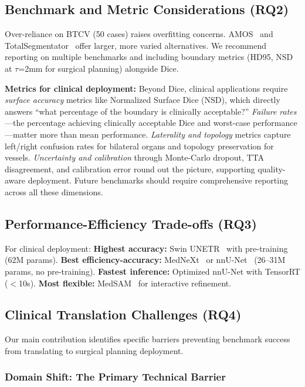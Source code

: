 \documentclass[conference]{IEEEtran}
\begin{document}
\subsection{Benchmark and Metric Considerations (RQ2)}

Over-reliance on BTCV (50 cases) raises overfitting concerns. AMOS~\cite{amos2022} and TotalSegmentator~\cite{wasserthal2023totalsegmentator} offer larger, more varied alternatives. We recommend reporting on multiple benchmarks and including boundary metrics (HD95, NSD at $\tau$=2mm for surgical planning) alongside Dice.

\textbf{Metrics for clinical deployment:} Beyond Dice, clinical applications require \emph{surface accuracy} metrics like Normalized Surface Dice (NSD), which directly answers ``what percentage of the boundary is clinically acceptable?'' \emph{Failure rates}---the percentage achieving clinically acceptable Dice and worst-case performance---matter more than mean performance. \emph{Laterality and topology} metrics capture left/right confusion rates for bilateral organs and topology preservation for vessels. \emph{Uncertainty and calibration} through Monte-Carlo dropout, TTA disagreement, and calibration error round out the picture, supporting quality-aware deployment. Future benchmarks should require comprehensive reporting across all these dimensions.

\subsection{Performance-Efficiency Trade-offs (RQ3)}

For clinical deployment: \textbf{Highest accuracy:} Swin UNETR~\cite{swinunetr2022} with pre-training (62M params). \textbf{Best efficiency-accuracy:} MedNeXt~\cite{roy2023mednext} or nnU-Net~\cite{isensee2021nnunet} (26--31M params, no pre-training). \textbf{Fastest inference:} Optimized nnU-Net with TensorRT ($<$10s). \textbf{Most flexible:} MedSAM~\cite{ma2024medsam} for interactive refinement.

\subsection{Clinical Translation Challenges (RQ4)}

Our main contribution identifies specific barriers preventing benchmark success from translating to surgical planning deployment.

\subsubsection{Domain Shift: The Primary Technical Barrier}
\label{sec:domain_shift}
\end{document}
